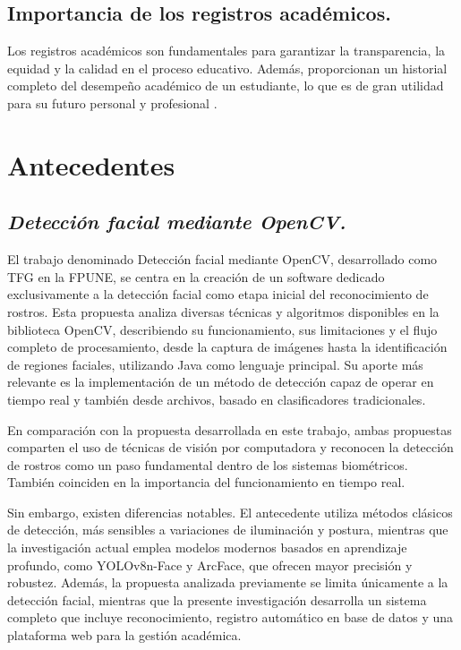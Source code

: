 \subsection{Importancia de los registros académicos.}
Los registros académicos son fundamentales para garantizar la transparencia, la equidad y la calidad en el proceso educativo. Además, proporcionan un historial completo del desempeño académico de un estudiante, lo que es de gran utilidad para su futuro personal y profesional \cite{registroAsistenciaUTA}.


\section{Antecedentes}

\subsection*{\textit{Detección facial mediante OpenCV.}} 

El trabajo denominado Detección facial mediante OpenCV, desarrollado como TFG en la FPUNE, se centra en la creación de un software dedicado exclusivamente a la detección facial como etapa inicial del reconocimiento de rostros. Esta propuesta analiza diversas técnicas y algoritmos disponibles en la biblioteca OpenCV, describiendo su funcionamiento, sus limitaciones y el flujo completo de procesamiento, desde la captura de imágenes hasta la identificación de regiones faciales, utilizando Java como lenguaje principal. Su aporte más relevante es la implementación de un método de detección capaz de operar en tiempo real y también desde archivos, basado en clasificadores tradicionales\cite{detecFacialOpenCV}.

En comparación con la propuesta desarrollada en este trabajo, ambas propuestas comparten el uso de técnicas de visión por computadora y reconocen la detección de rostros como un paso fundamental dentro de los sistemas biométricos. También coinciden en la importancia del funcionamiento en tiempo real.

Sin embargo, existen diferencias notables. El antecedente utiliza métodos clásicos de detección, más sensibles a variaciones de iluminación y postura, mientras que la investigación actual emplea modelos modernos basados en aprendizaje profundo, como YOLOv8n-Face y ArcFace, que ofrecen mayor precisión y robustez. Además, la propuesta analizada previamente se limita únicamente a la detección facial, mientras que la presente investigación desarrolla un sistema completo que incluye reconocimiento, registro automático en base de datos y una plataforma web para la gestión académica.

